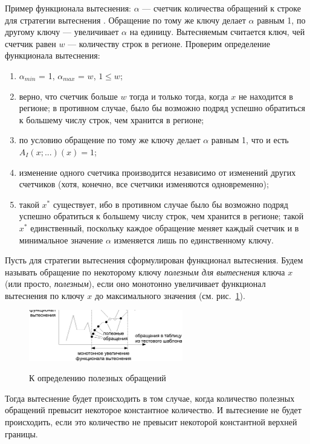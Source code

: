 Пример функционала вытеснения: $\alpha$ --- счетчик количества обращений к строке
для стратегии вытеснения \LRU. Обращение по тому же ключу делает $\alpha$
равным 1, по другому ключу --- увеличивает $\alpha$ на единицу. Вытесняемым
считается ключ, чей счетчик равен $w$ --- количеству строк в регионе. Проверим
определение функционала вытеснения:
\begin{enumerate}
    \item $\alpha_{min}$ = 1, $\alpha_{max}$ = $w$, $1 \leqslant w$;
    \item верно, что счетчик больше $w$ тогда и только тогда, когда $x$ не
находится в регионе; в противном случае, было бы возможно подряд успешно обратиться к
большему числу строк, чем хранится в регионе;
    \item по условию обращение по тому же ключу делает $\alpha$ равным 1, что
и есть $A_I(x;...)(x) = 1$;
    \item изменение одного счетчика производится независимо от изменений других счетчиков (хотя, конечно, все счетчики изменяются одновременно);
    \item такой $x^*$ существует, ибо в противном случае было бы возможно подряд успешно обратиться к большему числу строк, чем хранится в регионе; такой $x^*$ единственный, поскольку каждое обращение меняет каждый счетчик и в минимальное значение $\alpha$ изменяется лишь по единственному ключу.
\end{enumerate}

Пусть для стратегии вытеснения сформулирован функционал вытеснения. Будем называть
обращение по некоторому ключу \emph{полезным для вытеснения} ключа
$x$ (или просто, \emph{полезным}), если оно монотонно увеличивает функционал вытеснения по
ключу $x$ до максимального значения (см. рис.~\ref{useful}).\\

\begin{figure}[h] \center
  \includegraphics[width=0.6\textwidth]{2.theor/useful}\\
  \caption{К определению полезных обращений}\label{useful}
\end{figure}

Тогда вытеснение будет происходить в том случае, когда количество
полезных обращений превысит некоторое константное количество.
И вытеснение не будет происходить, если это количество не превысит некоторой константной верхней границы.

